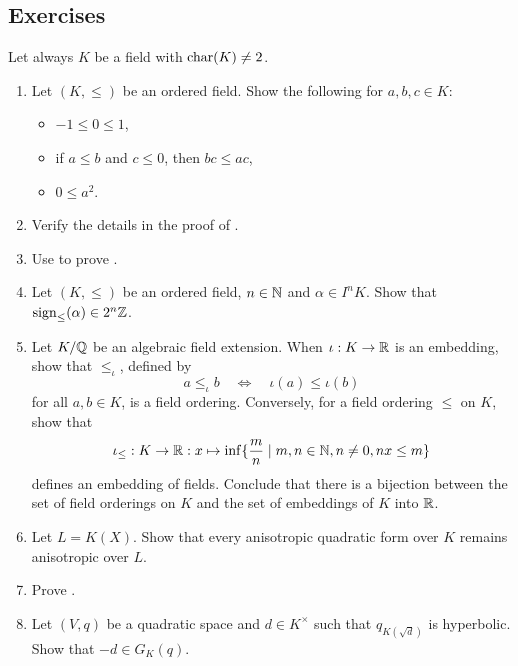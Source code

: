 \documentclass[12pt, leqno, british]{amsart}
\begin{document}
\subsection{Exercises}
Let always $K$ be a field with $\operatorname{char}(K) \neq 2$.
\begin{enumerate}
\item\label{ex:orderings-computations}
Let $(K, \leq)$ be an ordered field.
Show the following for $a, b, c \in K$:
\begin{itemize}
\item $-1 \leq 0 \leq 1$,
\item if $a \leq b$ and $c \leq 0$, then $bc \leq ac$,
\item $0 \leq a^2$.
\end{itemize}
\item Verify the details in the proof of .
\item Use  to prove .
\item Let $(K, \leq)$ be an ordered field, $n \in \mathbb N$ and $\alpha \in I^n K$.
Show that $\operatorname{sign}_{\leq}(\alpha) \in 2^n\mathbb Z$.
\item Let $K/\mathbb Q$ be an algebraic field extension.
When $\iota : K \to \mathbb R$ is an embedding, show that $\leq_\iota$, defined by
$$ a \leq_\iota b \quad\Leftrightarrow\quad \iota(a) \leq \iota(b)$$
for all $a, b \in K$, is a field ordering.
Conversely, for a field ordering $\leq$ on $K$, show that
$$ \iota_\leq : K \to \mathbb R : x \mapsto \inf \lbrace \frac{m}{n} \mid m, n \in \mathbb N, n \neq 0, nx \leq m \rbrace $$
defines an embedding of fields.
Conclude that there is a bijection between the set of field orderings on $K$ and the set of embeddings of $K$ into $\mathbb R$. 
\item Let $L = K(X)$.
Show that every anisotropic quadratic form over $K$ remains anisotropic over $L$.
\item Prove .
\item Let $(V, q)$ be a quadratic space and $d \in K^\times$ such that $q_{K(\sqrt{d})}$ is hyperbolic.
Show that $-d \in G_K(q)$.
\end{enumerate}
\end{document}
